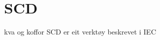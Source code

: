 \section{SCD}
\thispagestyle{fancy}

kva og koffor
 \gls{SCD} er eit verktøy beskrevet i IEC 



\newpage